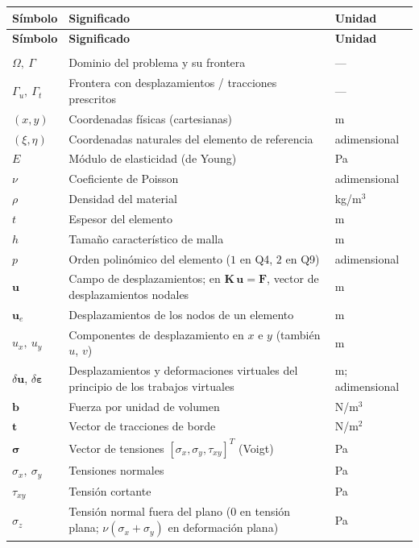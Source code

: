\renewcommand{\arraystretch}{1.2}
\begin{longtable}{@{}>{\raggedright\arraybackslash}p{3.0cm}p{7.8cm}p{3.0cm}@{}}
\toprule
\textbf{Símbolo} & \textbf{Significado} & \textbf{Unidad} \\
\midrule
\endfirsthead
\toprule
\textbf{Símbolo} & \textbf{Significado} & \textbf{Unidad} \\
\midrule
\endhead
\bottomrule
\endfoot
\multicolumn{3}{@{}l}{\textbf{Dominio, material y campos}} \\
\addlinespace
$\Omega,\ \Gamma$ & Dominio del problema y su frontera & --- \\
$\Gamma_u,\ \Gamma_t$ & Frontera con desplazamientos / tracciones prescritos & --- \\
$(x,y)$ & Coordenadas físicas (cartesianas) & m \\
$(\xi,\eta)$ & Coordenadas naturales del elemento de referencia & adimensional \\
$E$ & Módulo de elasticidad (de Young) & Pa \\
$\nu$ & Coeficiente de Poisson & adimensional \\
$\rho$ & Densidad del material & kg/m$^3$ \\
$t$ & Espesor del elemento & m \\
$h$ & Tamaño característico de malla & m \\
$p$ & Orden polinómico del elemento ($1$ en Q4, $2$ en Q9) & adimensional \\
$\bm{u}$ & Campo de desplazamientos; en $\bm{K}\,\bm{u}=\bm{F}$, vector de desplazamientos nodales & m \\
$\bm{u}_e$ & Desplazamientos de los nodos de un elemento & m \\
$u_x,\ u_y$ & Componentes de desplazamiento en $x$ e $y$ (también $u$, $v$) & m \\
$\delta\bm{u}$, $\delta\bm{\varepsilon}$ & Desplazamientos y deformaciones virtuales del principio de los trabajos virtuales & m; adimensional \\
$\bm{b}$ & Fuerza por unidad de volumen & N/m$^3$ \\
$\bm{t}$ & Vector de tracciones de borde & N/m$^2$ \\
$\bm{\sigma}$ & Vector de tensiones $[\sigma_x,\sigma_y,\tau_{xy}]^T$ (Voigt) & Pa \\
$\sigma_x,\ \sigma_y$ & Tensiones normales & Pa \\
$\tau_{xy}$ & Tensión cortante & Pa \\
$\sigma_z$ & Tensión normal fuera del plano ($0$ en tensión plana; $\nu(\sigma_x+\sigma_y)$ en deformación plana) & Pa \\

\end{longtable}
